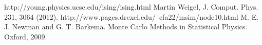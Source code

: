 \documentclass[runningheads]{llncs}
\begin{document}
%
\begin{thebibliography}{99}
http://young.physics.ucsc.edu/ising/ising.html
Martin Weigel, J. Comput. Phys. 231, 3064 (2012).
http://www.pages.drexel.edu/~cfa22/msim/node10.html 
M. E. J. Newman and G. T. Barkema. Monte Carlo Methods in Statistical Physics. Oxford, 2009.
\end{thebibliography}
\end{document}
